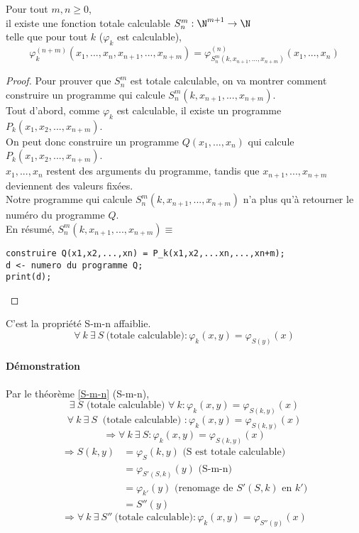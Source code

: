 \begin{mytheo}[S-m-n]
	\label{S-m-n}Pour tout $m,n \geq 0$, \\
	il existe une fonction totale calculable $S^m_n : \N^{m+1} \rightarrow
	\N$ \\
	telle que pour tout $k$ ($\varphi_k$ est calculable),
	$$ \varphi^{(n+m)}_k(x_1,...,x_n,x_{n+1},...,x_{n+m}) =
	\varphi^{(n)}_{S^m_n(k,x_{n+1}, ...,x_{n+m})} (x_1,...,x_n)$$
\end{mytheo}

\begin{proof}
	Pour prouver que $S^m_n$ est totale calculable, on va montrer comment construire un programme qui
	calcule  $S^m_n(k,x_{n+1}, ...,x_{n+m})$.\\
	Tout d'abord, comme $\varphi_k$ est calculable, il existe un programme
	$P_k(x_1,x_2,...,x_{n+m})$.\\
	On peut donc construire un programme $Q(x_1,...,x_n)$ qui calcule
	$P_k(x_1,x_2,...,x_{n+m})$.\\
	$x_1,...,x_n$ restent des arguments du programme,
	tandis que $x_{n+1},...,x_{n+m}$ deviennent des valeurs fixées.\\
	Notre programme qui calcule $S^m_n(k,x_{n+1}, ...,x_{n+m})$ n'a plus
	qu'à retourner le numéro du programme $Q$.\\
       	En résumé, $S^m_n(k,x_{n+1},
	...,x_{n+m}) \equiv$
	\begin{lstlisting}
construire Q(x1,x2,...,xn) = P_k(x1,x2,...xn,...,xn+m);
d <- numero du programme Q;
print(d);
	\end{lstlisting}
\end{proof}

\begin{mytheo}[S]
	C'est la propriété S-m-n affaiblie.
	\[ \forall \ k \ \exists \ S \ \text{(totale calculable)} : \varphi_k(x,y)=\varphi_{S(y)}(x)\]
\end{mytheo}

\paragraph{Démonstration}
	Par le théorème \ref{S-m-n} (S-m-n),
	\[ \exists \ S \text{ (totale calculable) } \forall \ k : \varphi_k(x,y)=\varphi_{S(k,y)}(x)\]
	\[ \forall \ k \ \exists \ S \ \text{ (totale calculable) } : \varphi_k(x,y)=\varphi_{S(k,y)}(x)\]
	\[ \Rightarrow \forall \ k \ \exists \ S : \varphi_k(x,y) =\varphi_{S(k,y)}(x) \]
	\begin{align}
		\Rightarrow S(k,y) &= \varphi_{S}(k,y) \text{ (S est totale calculable)}\\
		&= \varphi_{S'(S,k)}(y) \text{ (S-m-n)}\\
		&= \varphi_{k'}(y) \text{ (renomage de } S'(S,k) \text{ en } k' \text{)}\\
		&= S''(y)
	\end{align}
	\[ \Rightarrow \forall \ k \ \exists \ S'' \ \text{(totale calculable)} :
       	\varphi_k(x,y)=\varphi_{S''(y)}(x)\]

